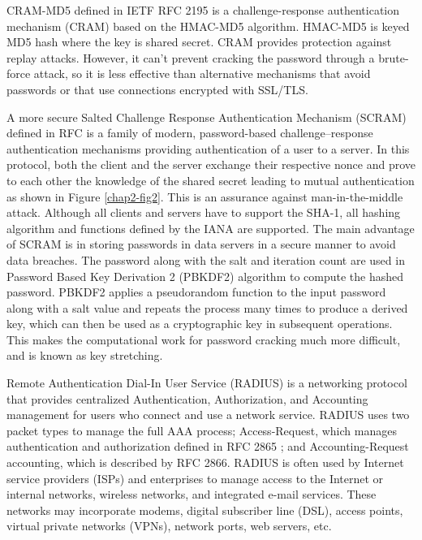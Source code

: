 \begin{multicols}{2}
CRAM-MD5 defined in IETF RFC 2195 \cite{chap2-key6} is a challenge-response authentication mechanism (CRAM) based on the HMAC-MD5 algorithm. HMAC-MD5 is keyed MD5 hash where the key is shared secret. CRAM provides protection against replay attacks. However, it can't prevent cracking the password through a brute-force attack, so it is less effective than alternative mechanisms that avoid passwords or that use connections encrypted with SSL/TLS. 

A more secure Salted Challenge Response Authentication Mechanism (SCRAM) defined in RFC \cite{chap2-key7} is a family of modern, password-based challenge--response authentication mechanisms providing authentication of a user to a server. In this protocol, both the client and the server exchange their respective nonce and prove to each other the knowledge of the shared secret leading to mutual authentication as shown in Figure \ref{chap2-fig2}. This is an assurance against man-in-the-middle attack. Although all clients and servers have to support the SHA-1, all hashing algorithm and functions defined by the IANA are supported. The main advantage of SCRAM is in storing passwords in data servers in a secure manner to avoid data breaches. The password along with the salt and iteration count are used in Password Based Key Derivation 2 (PBKDF2) algorithm to compute the hashed password. PBKDF2 applies a pseudorandom function to the input password along with a salt value and repeats the process many times to produce a derived key, which can then be used as a cryptographic key in subsequent operations. This makes the computational work for password cracking much more difficult, and is known as key stretching.

Remote Authentication Dial-In User Service (RADIUS) is a networking protocol that provides centralized Authentication, Authorization, and Accounting management for users who connect and use a network service. RADIUS uses two packet types to manage the full AAA process; Access-Request, which manages authentication and authorization defined in RFC 2865 \cite{chap2-key8}; and Accounting-Request accounting, which is described by RFC 2866. RADIUS is often used by Internet service providers (ISPs) and enterprises to manage access to the Internet or internal networks, wireless networks, and integrated e-mail services. These networks may incorporate modems, digital subscriber line (DSL), access points, virtual private networks (VPNs), network ports, web servers, etc.


\end{multicols}
